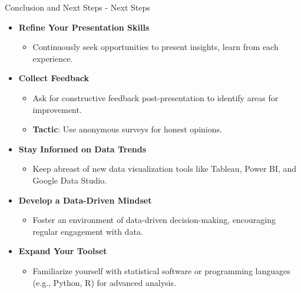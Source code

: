 \documentclass[aspectratio=169]{beamer}
\begin{document}
\begin{frame}[fragile]{Conclusion and Next Steps - Next Steps}
    \begin{itemize}
        \item \textbf{Refine Your Presentation Skills}
        \begin{itemize}
            \item Continuously seek opportunities to present insights, learn from each experience.
        \end{itemize}

        \item \textbf{Collect Feedback}
        \begin{itemize}
            \item Ask for constructive feedback post-presentation to identify areas for improvement.
            \item \textbf{Tactic}: Use anonymous surveys for honest opinions.
        \end{itemize}

        \item \textbf{Stay Informed on Data Trends}
        \begin{itemize}
            \item Keep abreast of new data visualization tools like Tableau, Power BI, and Google Data Studio.
        \end{itemize}

        \item \textbf{Develop a Data-Driven Mindset}
        \begin{itemize}
            \item Foster an environment of data-driven decision-making, encouraging regular engagement with data.
        \end{itemize}

        \item \textbf{Expand Your Toolset}
        \begin{itemize}
            \item Familiarize yourself with statistical software or programming languages (e.g., Python, R) for advanced analysis.
        \end{itemize}
    \end{itemize}
\end{frame}
\end{document}
